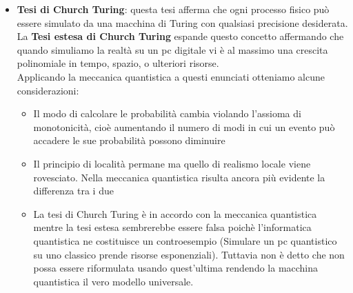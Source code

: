 \documentclass{article}
\begin{document}
\begin{itemize}
    \item \textbf{Tesi di Church Turing}: questa tesi afferma che ogni processo fisico può essere simulato da una macchina di Turing con qualsiasi precisione desiderata. 
    \\La \textbf{Tesi estesa di Church Turing} espande questo concetto affermando che quando simuliamo la realtà su un pc digitale vi è al massimo una crescita polinomiale in tempo, spazio, o ulteriori risorse.
    \medskip
    \\
    Applicando la meccanica quantistica a questi enunciati otteniamo alcune considerazioni:
    \begin{itemize}
        \item Il modo di calcolare le probabilità cambia violando l'assioma di monotonicità, cioè aumentando il numero di modi in cui un evento può accadere le sue probabilità possono diminuire
        \item Il principio di località permane ma quello di realismo locale viene rovesciato. Nella meccanica quantistica risulta ancora più evidente la differenza tra i due
        \item La tesi di Church Turing è in accordo con la meccanica quantistica mentre la tesi estesa sembrerebbe essere falsa poichè l'informatica quantistica ne costituisce un controesempio (Simulare un pc quantistico su uno classico prende risorse esponenziali). Tuttavia non è detto che non possa essere riformulata usando quest'ultima rendendo la macchina quantistica il vero modello universale.
    \end{itemize}
    \end{itemize}
\end{document}
